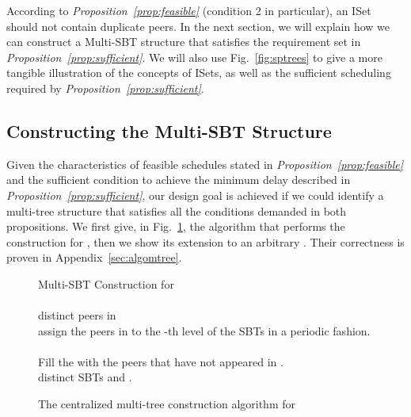 \documentclass[conference]{IEEEtran}
\begin{document}
  According to \textit{Proposition~\ref{prop:feasible}} (condition 2 in particular), an ISet should not contain duplicate peers. In the next section, we will explain how we can construct a Multi-SBT structure that satisfies the requirement set in \textit{Proposition~\ref{prop:sufficient}}. We will also use Fig.~\ref{fig:sptrees} to give a more tangible illustration of the concepts of ISets, as well as the sufficient scheduling required by \textit{Proposition~\ref{prop:sufficient}}.

\subsection{Constructing the Multi-SBT Structure} \label{sec:csbt}
Given the characteristics of feasible schedules stated in \textit{Proposition~\ref{prop:feasible}} and the sufficient condition to achieve the minimum delay described in \textit{Proposition~\ref{prop:sufficient}}, our design goal is achieved if we could identify a multi-tree structure that satisfies all the conditions demanded in both propositions. We first give, in Fig.~\ref{fig:algomtree}, the algorithm that performs the construction for , then we show its extension to an arbitrary . Their correctness is proven in Appendix~\ref{sec:algomtree}.
\begin{figure}[htb]
  \begin{algorithm}{Multi-SBT Construction for }{
  \label{algo:algostd}}
 \\
  \qrepeat \\
     distinct peers in  \\
    \qdo assign the peers in  to the -th level of the SBTs in a periodic fashion. \\
    
  \quntil  \\
  Fill the  with the peers that have not appeared in .\\
  \qreturn  distinct SBTs and .
  \end{algorithm}\caption{The centralized multi-tree construction algorithm for } \label{fig:algomtree}
  \end{figure}
\end{document}
